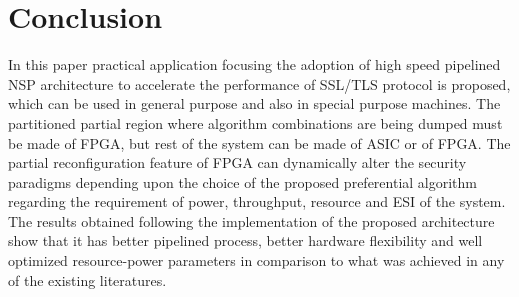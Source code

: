 \documentclass[3p,times]{elsarticle}
\begin{document}
\section{Conclusion}
In this paper practical application focusing the adoption of high speed pipelined NSP architecture to accelerate the performance of SSL/TLS protocol is proposed, which can be used in general purpose and also in special purpose machines. The partitioned partial region where algorithm combinations are being dumped must be made of FPGA, but rest of the system can be made of ASIC or of FPGA. The partial reconfiguration feature of FPGA can dynamically alter the security paradigms depending upon the choice of the proposed preferential algorithm regarding the requirement of power, throughput, resource and ESI of the system. The results obtained following the implementation of the proposed architecture show that it has better pipelined process, better hardware flexibility and well optimized resource-power parameters in comparison to what was achieved in any of the existing literatures.
\vspace{-8pt}




\end{document}
